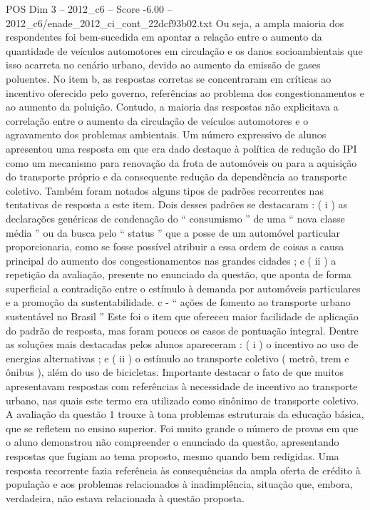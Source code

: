 \begin{textsample}{POS Dim 3 – 2012\_c6 – Score -6.00 – 2012\_c6/enade\_2012\_ci\_cont\_22dcf93b02.txt}
Ou seja, a ampla maioria dos respondentes foi bem-sucedida em apontar a relação entre o aumento da quantidade de veículos automotores em circulação e os danos socioambientais que isso acarreta no cenário urbano, devido ao aumento da emissão de gases poluentes.
No item b, as respostas corretas se concentraram em críticas ao incentivo oferecido pelo governo, referências ao problema dos congestionamentos e ao aumento da poluição.
Contudo, a maioria das respostas não explicitava a correlação entre o aumento da circulação de veículos automotores e o agravamento dos problemas ambientais.
Um número expressivo de alunos apresentou uma resposta em que era dado destaque à política de redução do IPI como um mecanismo para renovação da frota de automóveis ou para a aquisição do transporte próprio e da consequente redução da dependência ao transporte coletivo.
Também foram notados alguns tipos de padrões recorrentes nas tentativas de resposta a este item.
Dois desses padrões se destacaram : ( i ) as declarações genéricas de condenação do “ consumismo ” de uma “ nova classe média ” ou da busca pelo “ status ” que a posse de um automóvel particular proporcionaria, como se fosse possível atribuir a essa ordem de coisas a causa principal do aumento dos congestionamentos nas grandes cidades ; e ( ii ) a repetição da avaliação, presente no enunciado da questão, que aponta de forma superficial a contradição entre o estímulo à demanda por automóveis particulares e a promoção da sustentabilidade. c - “ ações de fomento ao transporte urbano sustentável no Brasil ” Este foi o item que ofereceu maior facilidade de aplicação do padrão de resposta, mas foram poucos os casos de pontuação integral.
Dentre as soluções mais destacadas pelos alunos apareceram : ( i ) o incentivo ao uso de energias alternativas ; e ( ii ) o estímulo ao transporte coletivo ( metrô, trem e ônibus ), além do uso de bicicletas.
Importante destacar o fato de que muitos apresentavam respostas com referências à necessidade de incentivo ao transporte urbano, nas quais este termo era utilizado como sinônimo de transporte coletivo.
A avaliação da questão 1 trouxe à tona problemas estruturais da educação básica, que se refletem no ensino superior.
Foi muito grande o número de provas em que o aluno demonstrou não compreender o enunciado da questão, apresentando respostas que fugiam ao tema proposto, mesmo quando bem redigidas.
Uma resposta recorrente fazia referência às consequências da ampla oferta de crédito à população e aos problemas relacionados à inadimplência, situação que, embora, verdadeira, não estava relacionada à questão proposta.

\end{textsample}
